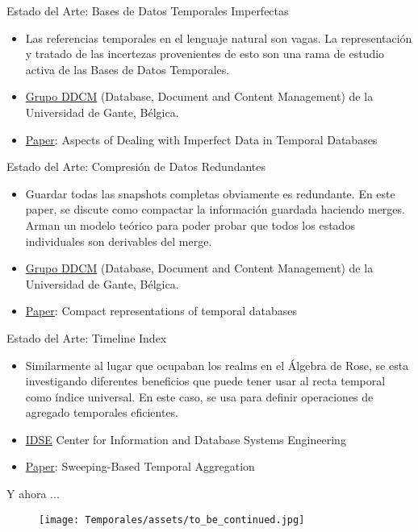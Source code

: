 \documentclass[handout, t, aspectratio=169]{beamer}
\begin{document}
\begin{frame}{Estado del Arte: Bases de Datos Temporales Imperfectas}
    \begin{itemize}
        \item Las referencias temporales en el lenguaje natural son vagas. La representación y tratado de las incertezas provenientes de esto son una rama de estudio activa de las Bases de Datos Temporales.\pause
        \item \href{https://ddcm.ugent.be/}{Grupo DDCM} (Database, Document and Content Management) de la Universidad de Gante, Bélgica.\pause
        \item \href{https://link.springer.com/chapter/10.1007/978-3-319-00954-4_9}{Paper}: Aspects of Dealing with Imperfect Data in Temporal Databases
    \end{itemize}
\end{frame}

\begin{frame}{Estado del Arte: Compresión de Datos Redundantes}
    \begin{itemize}
        \item Guardar todas las snapshots completas obviamente es redundante. En este paper, se discute como compactar la información guardada haciendo merges. Arman un modelo teórico para poder probar que todos los estados individuales son derivables del merge. \pause
        \item \href{https://ddcm.ugent.be/}{Grupo DDCM} (Database, Document and Content Management) de la Universidad de Gante, Bélgica.\pause
        \item \href{https://link.springer.com/article/10.1007/s00778-018-0535-4}{Paper}: Compact representations of temporal databases
    \end{itemize}
\end{frame}

\begin{frame}{Estado del Arte: Timeline Index}
    \begin{itemize}
        \item Similarmente al lugar que ocupaban los realms en el Álgebra de Rose, se esta investigando diferentes beneficios que puede tener usar al recta temporal como índice universal. En este caso, se usa para definir operaciones de agregado temporales eficientes.\pause
        \item \href{https://www.inf.unibz.it/idse/}{IDSE} Center for Information and Database Systems Engineering\pause
        \item \href{https://link.springer.com/chapter/10.1007\%2F978-3-319-64367-0_7}{Paper}: Sweeping-Based Temporal Aggregation
    \end{itemize}
\end{frame}

\begin{frame}{Y ahora ...}
    \begin{figure}
        \texttt{[image: Temporales/assets/to\_be\_continued.jpg]}
        \label{fig:to_be_continued}
    \end{figure}
\end{frame}
\end{document}
